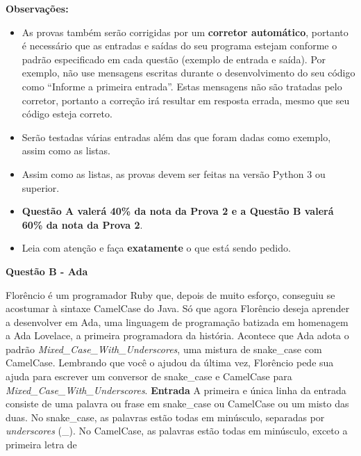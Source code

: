 \documentclass[a4paper, 12pt]{article}
\begin{document}
\textbf{{\large Observações:}}
\begin{itemize}
	\item As provas também serão corrigidas por um \textbf{corretor automático}, portanto é necessário que as entradas e saídas do seu programa estejam conforme o padrão especificado em cada questão (exemplo de entrada e saída). Por exemplo, não use mensagens escritas durante o desenvolvimento do seu código como “Informe a primeira entrada”. Estas mensagens não são tratadas pelo corretor, portanto a correção irá resultar em resposta errada, mesmo que seu código esteja correto.
	\item Serão testadas várias entradas além das que foram dadas como exemplo, assim como as listas.
	\item Assim como as listas, as provas devem ser feitas na versão Python 3 ou superior.
	\item \textbf{Questão A valerá 40\% da nota da Prova 2 e a Questão B valerá 60\% da nota da Prova 2}.
	\item Leia com atenção e faça \textbf{exatamente} o que está sendo pedido.
\end{itemize}
\newpage %
\begin{center}
\textbf{{\Large Questão B - Ada}}
\end{center}
\vspace{5pt}
Florêncio é um programador Ruby que, depois de muito esforço, conseguiu se
acostumar à sintaxe CamelCase do Java. Só que agora Florêncio deseja aprender a desenvolver em Ada, uma linguagem de programação batizada em homenagem a Ada Lovelace, a primeira programadora da história. Acontece que Ada adota o padrão \textit{Mixed\_Case\_With\_Underscores}, uma mistura
de snake\_case com CamelCase. \newline \newline
Lembrando que você o ajudou da última vez, Florêncio pede sua ajuda para
escrever um conversor de snake\_case e CamelCase para \textit{Mixed\_Case\_With\_Underscores}. \newline \newline
\textbf{{\large Entrada}} \newline
A primeira e única linha da entrada consiste de uma palavra ou frase em
snake\_case ou CamelCase ou um misto das duas. \newline
No snake\_case, as palavras estão todas em minúsculo, separadas por \textit{underscores} (\_). \newline
No CamelCase, as palavras estão todas em minúsculo, exceto a primeira letra de
\end{document}
